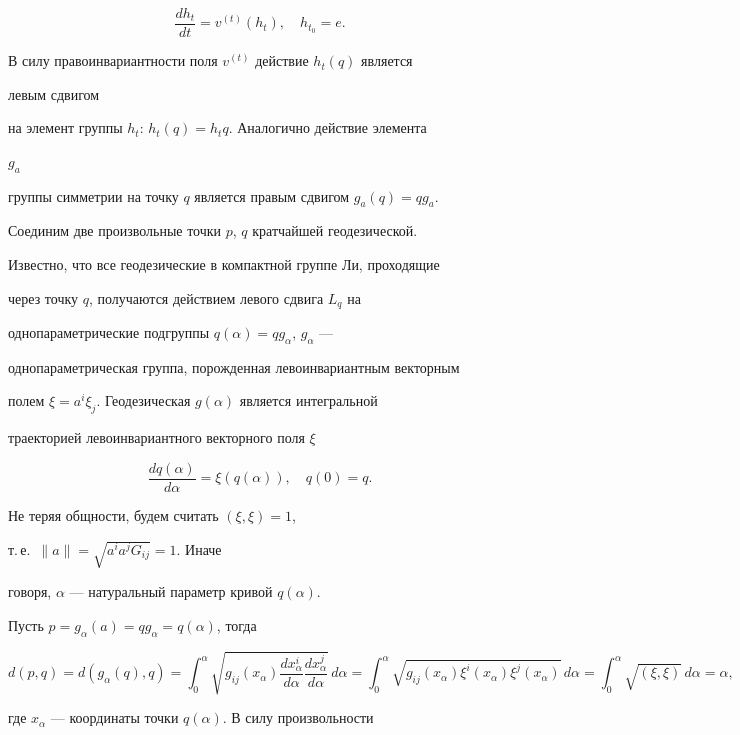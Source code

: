 $$ 


\frac{d h_t}{d t}=v^{(t)}(h_t),\quad h_{t_0}=e. 


$$ 


В силу правоинвариантности поля $v^{(t)}$ действие $h_t(q)$ является 


левым сдвигом 


на элемент группы $h_t$: $h_t(q)=h_t q$. Аналогично действие элемента 


$g_a$ 


группы симметрии на точку $q$ является правым сдвигом $g_a(q)=q g_a$. 


Соединим две произвольные точки $p$, $q$ кратчайшей геодезической. 


Известно, что все геодезические в компактной группе Ли, проходящие 


через точку $q$, получаются действием левого сдвига $L_q$ на 


однопараметрические подгруппы $q(\alpha)=q g_\alpha$, $g_\alpha$ --- 


однопараметрическая группа, порожденная левоинвариантным векторным 


полем $\xi=a^i\xi_j$. Геодезическая $g(\alpha)$ является интегральной 


траекторией левоинвариантного векторного поля $\xi$ 


$$ 


\frac{d q(\alpha)}{d\alpha}=\xi(q(\alpha)),\quad q(0)=q. 


$$ 


Не теряя общности, будем считать $(\xi,\xi)=1$, 


т.\,е.~$\|a\|=\sqrt{a^i a^j G_{ij}}=1$. Иначе 


говоря, $\alpha$ --- натуральный параметр кривой $q(\alpha)$. 


 


Пусть $p=g_\alpha(a)=q g_\alpha=q(\alpha)$, тогда 


$$ 


d(p,q)=d(g_\alpha(q),q)=\int^\alpha_0 


\sqrt{g_{ij}(x_\alpha)\dfrac{d x^i_\alpha}{d\alpha} 


\dfrac{d x^j_\alpha}{d\alpha}}\,d\alpha=\int^\alpha_0 


\sqrt{g_{ij}(x_\alpha)\xi^i(x_\alpha)\xi^j(x_\alpha)}\, 


d\alpha=\int^\alpha_0\sqrt{(\xi,\xi)}\,d\alpha=\alpha, 


$$ 


где $x_\alpha$ --- координаты точки $q(\alpha)$. В силу произвольности 


